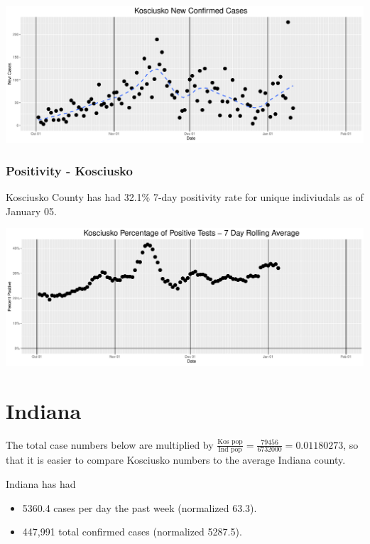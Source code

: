 \documentclass[
]{article}
\providecommand{\tightlist}{%
  \setlength{\itemsep}{0pt}\setlength{\parskip}{0pt}}
\begin{document}
\includegraphics{Grace_internal4_files/figure-latex/unnamed-chunk-15-1.pdf}

\hypertarget{positivity---kosciusko}{%
\subsubsection{Positivity - Kosciusko}\label{positivity---kosciusko}}

Kosciusko County has had 32.1\% 7-day positivity rate for unique
indiviudals as of January 05.

\includegraphics{Grace_internal4_files/figure-latex/unnamed-chunk-16-1.pdf}

\newpage

\hypertarget{indiana}{%
\section{Indiana}\label{indiana}}

The total case numbers below are multiplied by
\(\frac{\text{Kos pop}}{\text{Ind pop}} = \frac{79456}{6732000} = 0.01180273\),
so that it is easier to compare Kosciusko numbers to the average Indiana
county.

Indiana has had

\begin{itemize}
\tightlist
\item
  5360.4 cases per day the past week (normalized 63.3).
\item
  447,991 total confirmed cases (normalized 5287.5).
\end{itemize}
\end{document}
